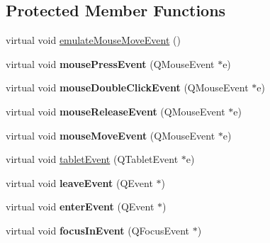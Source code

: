 \subsection*{Protected Member Functions}
\begin{DoxyCompactItemize}
\item 
virtual void \hyperlink{classQG__GraphicView_aeec937f6605c1894d57b9d2839fe1f76}{emulate\-Mouse\-Move\-Event} ()
\item 
\hypertarget{classQG__GraphicView_a4ca619f9faacf46d82081a59aa8e959c}{virtual void {\bfseries mouse\-Press\-Event} (Q\-Mouse\-Event $\ast$e)}\label{classQG__GraphicView_a4ca619f9faacf46d82081a59aa8e959c}

\item 
\hypertarget{classQG__GraphicView_a8e6a56e178dec7a35bf799c7362d2b62}{virtual void {\bfseries mouse\-Double\-Click\-Event} (Q\-Mouse\-Event $\ast$e)}\label{classQG__GraphicView_a8e6a56e178dec7a35bf799c7362d2b62}

\item 
\hypertarget{classQG__GraphicView_a347769a7fd025d6f1280ac92aa81b7d3}{virtual void {\bfseries mouse\-Release\-Event} (Q\-Mouse\-Event $\ast$e)}\label{classQG__GraphicView_a347769a7fd025d6f1280ac92aa81b7d3}

\item 
\hypertarget{classQG__GraphicView_a1873406c29cc2ec9ff34b65c93946764}{virtual void {\bfseries mouse\-Move\-Event} (Q\-Mouse\-Event $\ast$e)}\label{classQG__GraphicView_a1873406c29cc2ec9ff34b65c93946764}

\item 
virtual void \hyperlink{classQG__GraphicView_ad15fb6b018feb58a1c5d674eb28f32f8}{tablet\-Event} (Q\-Tablet\-Event $\ast$e)
\item 
\hypertarget{classQG__GraphicView_a2c87abd9d99f0d50618d726380c64e3d}{virtual void {\bfseries leave\-Event} (Q\-Event $\ast$)}\label{classQG__GraphicView_a2c87abd9d99f0d50618d726380c64e3d}

\item 
\hypertarget{classQG__GraphicView_a66c6ef760d21dfeaa2345e3bfa2eec1f}{virtual void {\bfseries enter\-Event} (Q\-Event $\ast$)}\label{classQG__GraphicView_a66c6ef760d21dfeaa2345e3bfa2eec1f}

\item 
\hypertarget{classQG__GraphicView_abede89474747893d469cb896caa07dbe}{virtual void {\bfseries focus\-In\-Event} (Q\-Focus\-Event $\ast$)}\label{classQG__GraphicView_abede89474747893d469cb896caa07dbe}


\end{DoxyCompactItemize}
